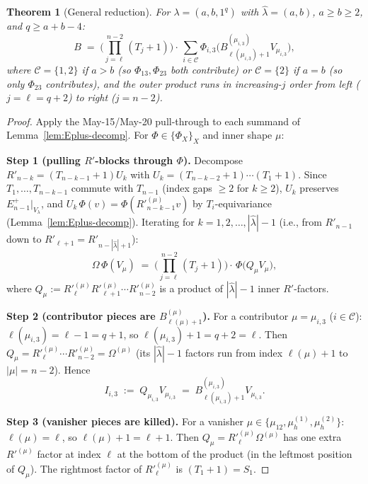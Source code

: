 \documentclass[11pt]{article}
\newtheorem{theorem}{Theorem}
\theoremstyle{definition}
\newcommand{\Vlam}{V_\lambda}
\newcommand{\Om}{\Omega}
\newcommand{\hatl}{\widehat\lambda}
\newcommand{\Rp}{{R'}}
\begin{document}
\begin{theorem}[General reduction]\label{thm:reduction}
For $\lambda = (a, b, 1^q)$ with $\hatl = (a, b)$, $a \ge b \ge 2$,
and $q \ge a + b - 4$:
\begin{equation}\label{eq:reduction}
   B \;=\; \biggl(\prod_{j = \ell}^{n-2}(T_j + 1)\biggr)
   \cdot\,\sum_{i \in \mathcal{C}}
   \Phi_{i,3}\bigl(B^{(\mu_{i,3})}_{\ell(\mu_{i,3})+1} V_{\mu_{i,3}}\bigr),
\end{equation}
where $\mathcal{C} = \{1, 2\}$ if $a > b$ (so $\Phi_{13}, \Phi_{23}$
both contribute) or $\mathcal{C} = \{2\}$ if $a = b$ (so only
$\Phi_{23}$ contributes), and the outer product runs in increasing-$j$
order from left ($j = \ell = q+2$) to right ($j = n-2$).
\end{theorem}

\begin{proof}
Apply the May-15/May-20 pull-through to each summand of
Lemma~\ref{lem:Eplus-decomp}.  For $\Phi \in \{\Phi_X\}_X$ and inner
shape $\mu$:

\medskip\textbf{Step 1 (pulling $\Rp$-blocks through $\Phi$).}
Decompose $\Rp_{n-k} = (T_{n-k-1} + 1) U_k$ with $U_k = (T_{n-k-2}+1)
\cdots (T_1 + 1)$.  Since $T_1, \ldots, T_{n-k-1}$ commute with
$T_{n-1}$ (index gaps $\ge 2$ for $k \ge 2$), $U_k$ preserves
$E_{n-1}^+|_{\Vlam}$, and $U_k\,\Phi(v) = \Phi(\Rp_{n-k-1}^{(\mu)} v)$
by $T_i$-equivariance (Lemma~\ref{lem:Eplus-decomp}).  Iterating for
$k = 1, 2, \ldots, |\hatl| - 1$ (i.e., from $\Rp_{n-1}$ down to
$\Rp_{\ell+1} = \Rp_{n - |\hatl| + 1}$):
\begin{equation}\label{eq:branchpull}
   \Om\,\Phi(V_\mu) \;=\; \biggl(\prod_{j = \ell}^{n-2}(T_j + 1)\biggr)
   \cdot\, \Phi\bigl(Q_\mu V_\mu\bigr),
\end{equation}
where $Q_\mu := \Rp_{\ell}^{(\mu)} \Rp_{\ell+1}^{(\mu)} \cdots
\Rp_{n-2}^{(\mu)}$ is a product of $|\hatl| - 1$ inner $\Rp$-factors.

\medskip\textbf{Step 2 (contributor pieces are $B^{(\mu)}_{\ell(\mu)+1}$).}
For a contributor $\mu = \mu_{i,3}$ ($i \in \mathcal{C}$):
$\ell(\mu_{i,3}) = \ell - 1 = q + 1$, so
$\ell(\mu_{i,3}) + 1 = q + 2 = \ell$.  Then $Q_\mu = \Rp_{\ell}^{(\mu)}
\cdots \Rp_{n-2}^{(\mu)} = \Om^{(\mu)}$ (its $|\hatl| - 1$ factors run
from index $\ell(\mu) + 1$ to $|\mu| = n - 2$).  Hence
\[
   I_{i,3} \;:=\; Q_{\mu_{i,3}} V_{\mu_{i,3}} \;=\; B^{(\mu_{i,3})}_{\ell(\mu_{i,3})+1}
   V_{\mu_{i,3}}.
\]

\medskip\textbf{Step 3 (vanisher pieces are killed).}
For a vanisher $\mu \in \{\mu_{12}, \mu_h^{(1)}, \mu_h^{(2)}\}$:
$\ell(\mu) = \ell$, so $\ell(\mu) + 1 = \ell + 1$.  Then $Q_\mu =
\Rp_{\ell}^{(\mu)} \Om^{(\mu)}$ has one extra $\Rp^{(\mu)}$ factor at
index $\ell$ at the bottom of the product (in the leftmost position of
$Q_\mu$).  The rightmost factor of $\Rp_{\ell}^{(\mu)}$ is
$(T_1 + 1) = S_1$.


\end{proof}
\end{document}
